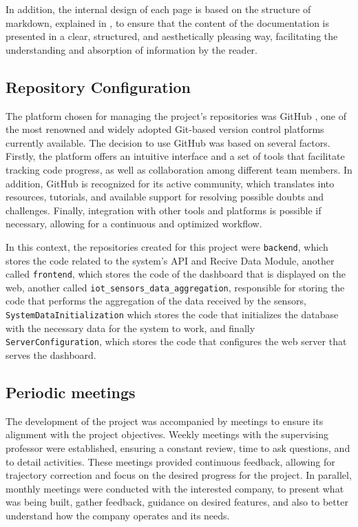In addition, the internal design of each page is based on the structure of markdown, explained in \cite{markdownguide}, to ensure that the content of the documentation is presented in a clear, structured, and aesthetically pleasing way, facilitating the understanding and absorption of information by the reader.

\subsection{Repository Configuration}
The platform chosen for managing the project's repositories was GitHub \cite{github}, one of the most renowned and widely adopted Git-based version control platforms currently available. The decision to use GitHub was based on several factors. Firstly, the platform offers an intuitive interface and a set of tools that facilitate tracking code progress, as well as collaboration among different team members. In addition, GitHub is recognized for its active community, which translates into resources, tutorials, and available support for resolving possible doubts and challenges. Finally, integration with other tools and platforms is possible if necessary, allowing for a continuous and optimized workflow. 

In this context, the repositories created for this project were \texttt{backend}, which stores the code related to the system's \gls{API} and Recive Data Module, another called \texttt{frontend}, which stores the code of the dashboard that is displayed on the web, another called \texttt{iot\_sensors\_data\_aggregation}, responsible for storing the code that performs the aggregation of the data received by the sensors, \texttt{SystemDataInitialization} which stores the code that initializes the database with the necessary data for the system to work, and finally \texttt{ServerConfiguration}, which stores the code that configures the web server that serves the dashboard. 

\subsection{Periodic meetings}
The development of the project was accompanied by meetings to ensure its alignment with the project objectives. Weekly meetings with the supervising professor were established, ensuring a constant review, time to ask questions, and to detail activities. These meetings provided continuous feedback, allowing for trajectory correction and focus on the desired progress for the project. In parallel, monthly meetings were conducted with the interested company, to present what was being built, gather feedback, guidance on desired features, and also to better understand how the company operates and its needs.

